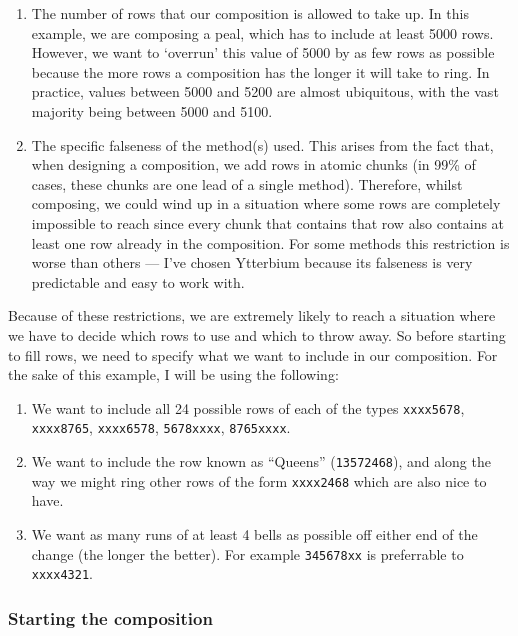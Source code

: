 \documentclass[12pt]{article}
\newcommand{\row}[1]{\texttt{#1}}
\begin{document}
\begin{enumerate}
    \item The number of rows that our composition is allowed to take up.  In this example, we are
        composing a peal, which has to include at least 5000 rows.  However, we want to `overrun'
        this value of 5000 by as few rows as possible because the more rows a composition has the
        longer it will take to ring.  In practice, values between 5000 and 5200 are almost ubiquitous,
        with the vast majority being between 5000 and 5100.
    \item The specific falseness of the method(s) used.  This arises from the fact that, when designing
        a composition, we add rows in atomic chunks (in 99\% of cases, these chunks are one lead of
        a single method).  Therefore, whilst composing, we could wind up in a situation where some
        rows are completely impossible to reach since every chunk that contains that row also
        contains at least one row already in the composition.  For some methods this restriction is
        worse than others --- I've chosen Ytterbium because its falseness is very predictable and
        easy to work with.
\end{enumerate}

\noindent Because of these restrictions, we are extremely likely to reach a situation where we have
to decide which rows to use and which to throw away.  So before starting to fill rows, we need to
specify what we want to include in our composition.  For the sake of this example, I will be using
the following:

\begin{enumerate}
    \item We want to include all 24 possible rows of each of the types \row{xxxx5678}, \row{xxxx8765},
        \row{xxxx6578}, \row{5678xxxx}, \row{8765xxxx}.
    \item We want to include the row known as ``Queens'' (\row{13572468}), and along the way we might
        ring other rows of the form \row{xxxx2468} which are also nice to have.
    \item We want as many runs of at least 4 bells as possible off either end of the change
        (the longer the better).  For example \row{345678xx} is preferrable to \row{xxxx4321}.
\end{enumerate}

\subsubsection{Starting the composition}
\end{document}
